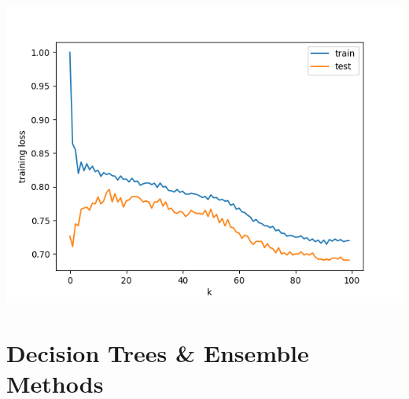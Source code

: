     \includegraphics[width=\textwidth / 2]{plots/kmeans_noisy_loss}

    \section{Decision Trees \& Ensemble Methods}
